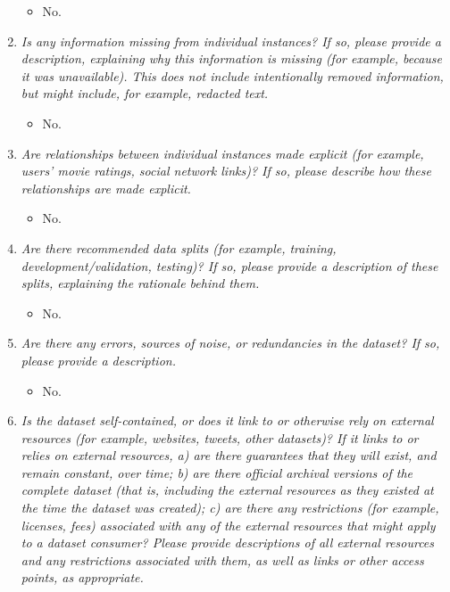 \documentclass[
]{article}
\providecommand{\tightlist}{%
  \setlength{\itemsep}{0pt}\setlength{\parskip}{0pt}}
\begin{document}
\begin{enumerate}
  \begin{itemize}
  \tightlist
  \item
    No.
  \end{itemize}
\item
  \emph{Is any information missing from individual instances? If so,
  please provide a description, explaining why this information is
  missing (for example, because it was unavailable). This does not
  include intentionally removed information, but might include, for
  example, redacted text.}

  \begin{itemize}
  \tightlist
  \item
    No.
  \end{itemize}
\item
  \emph{Are relationships between individual instances made explicit
  (for example, users' movie ratings, social network links)? If so,
  please describe how these relationships are made explicit.}

  \begin{itemize}
  \tightlist
  \item
    No.
  \end{itemize}
\item
  \emph{Are there recommended data splits (for example, training,
  development/validation, testing)? If so, please provide a description
  of these splits, explaining the rationale behind them.}

  \begin{itemize}
  \tightlist
  \item
    No.
  \end{itemize}
\item
  \emph{Are there any errors, sources of noise, or redundancies in the
  dataset? If so, please provide a description.}

  \begin{itemize}
  \tightlist
  \item
    No.
  \end{itemize}
\item
  \emph{Is the dataset self-contained, or does it link to or otherwise
  rely on external resources (for example, websites, tweets, other
  datasets)? If it links to or relies on external resources, a) are
  there guarantees that they will exist, and remain constant, over time;
  b) are there official archival versions of the complete dataset (that
  is, including the external resources as they existed at the time the
  dataset was created); c) are there any restrictions (for example,
  licenses, fees) associated with any of the external resources that
  might apply to a dataset consumer? Please provide descriptions of all
  external resources and any restrictions associated with them, as well
  as links or other access points, as appropriate.}


\end{enumerate}
\end{document}

